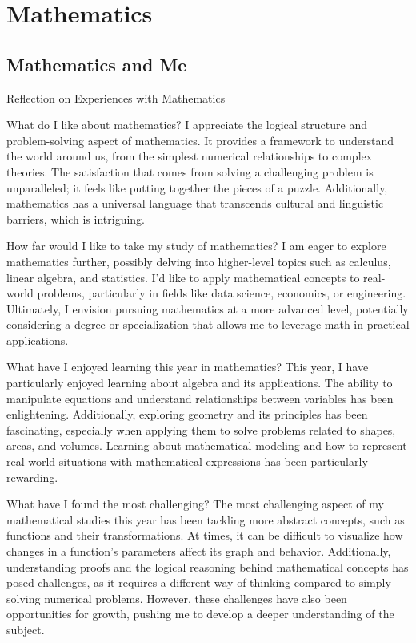 \documentclass{article}
\begin{document}
\section{Mathematics}

\subsection{Mathematics and Me}

Reflection on Experiences with Mathematics

What do I like about mathematics?
I appreciate the logical structure and problem-solving aspect of mathematics. It provides a framework to understand the world around us, from the simplest numerical relationships to complex theories. The satisfaction that comes from solving a challenging problem is unparalleled; it feels like putting together the pieces of a puzzle. Additionally, mathematics has a universal language that transcends cultural and linguistic barriers, which is intriguing.


How far would I like to take my study of mathematics?
I am eager to explore mathematics further, possibly delving into higher-level topics such as calculus, linear algebra, and statistics. I’d like to apply mathematical concepts to real-world problems, particularly in fields like data science, economics, or engineering. Ultimately, I envision pursuing mathematics at a more advanced level, potentially considering a degree or specialization that allows me to leverage math in practical applications.


What have I enjoyed learning this year in mathematics?
This year, I have particularly enjoyed learning about algebra and its applications. The ability to manipulate equations and understand relationships between variables has been enlightening. Additionally, exploring geometry and its principles has been fascinating, especially when applying them to solve problems related to shapes, areas, and volumes. Learning about mathematical modeling and how to represent real-world situations with mathematical expressions has been particularly rewarding.


What have I found the most challenging?
The most challenging aspect of my mathematical studies this year has been tackling more abstract concepts, such as functions and their transformations. At times, it can be difficult to visualize how changes in a function's parameters affect its graph and behavior. Additionally, understanding proofs and the logical reasoning behind mathematical concepts has posed challenges, as it requires a different way of thinking compared to simply solving numerical problems. However, these challenges have also been opportunities for growth, pushing me to develop a deeper understanding of the subject.
\end{document}
